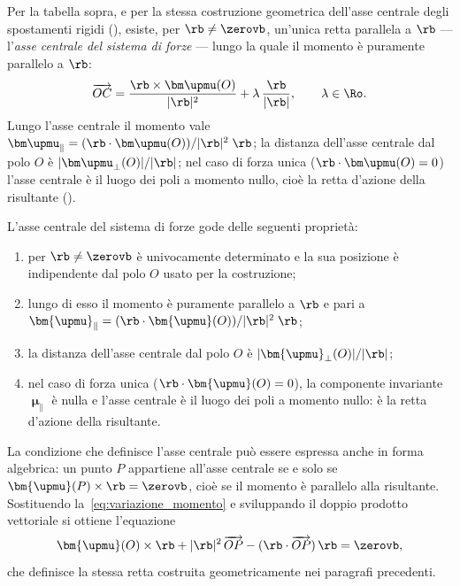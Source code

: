 Per la tabella sopra, e per la stessa costruzione geometrica dell'asse centrale degli spostamenti rigidi (), esiste, per $\rb\neq\zerovb$, un'unica
retta parallela a $\rb$ --- l'\textit{asse centrale del sistema di
	forze} --- lungo la
quale il momento è puramente parallelo a $\rb$:
\begin{equation}\label{eq:asse_centrale_forze}
	\overrightarrow{OC}
	= \frac{\rb\times\bm\upmu(O)}{|\rb|^2}
	+ \lambda\,\frac{\rb}{|\rb|}, \qquad \lambda\in\Ro.
\end{equation}
Lungo l'asse centrale il momento vale $\bm\upmu_\parallel
= (\rb\cdot\bm\upmu(O))/|\rb|^2\;\rb$; la distanza dell'asse centrale dal
polo $O$ è $|\bm\upmu_\perp(O)|/|\rb|$; nel caso di forza unica
($\rb\cdot\bm\upmu(O)=0$) l'asse centrale è il luogo dei poli a momento
nullo, cioè la retta d'azione della risultante
().






L'asse centrale del sistema di forze gode delle seguenti
proprietà:
\begin{enumerate}[label=(\roman*)]
	\item per $\rb \neq \zerovb$ è univocamente determinato e
	la sua posizione è indipendente dal polo $O$ usato per la
	costruzione;
	\item lungo di esso il momento è puramente parallelo a
	$\rb$ e pari a
	$\bm{\upmu}_{\parallel}
	= (\rb \cdot \bm{\upmu}(O))/|\rb|^2\;\rb$;
	\item la distanza dell'asse centrale dal polo $O$ è
	$|\bm{\upmu}_{\perp}(O)|/|\rb|$;
	\item nel caso di forza unica
	($\rb \cdot \bm{\upmu}(O) = 0$), la componente invariante
	$\bm{\upmu}_{\parallel}$ è nulla e l'asse centrale è il
	luogo dei poli a momento nullo: è la retta d'azione della
	risultante.
\end{enumerate}

\begin{oss}
	La condizione che definisce l'asse centrale può essere
	espressa anche in forma algebrica: un punto $P$ appartiene
	all'asse centrale se e solo se
	$\bm{\upmu}(P) \times \rb = \zerovb$, cioè se il momento
	è parallelo alla risultante. Sostituendo
	la~\eqref{eq:variazione_momento} e sviluppando il doppio
	prodotto vettoriale si ottiene l'equazione
	\begin{equation}\label{eq:asse_centrale_algebrica_F}
		\bm{\upmu}(O) \times \rb
		+ |\rb|^2\,\overrightarrow{OP}
		- (\rb \cdot \overrightarrow{OP})\,\rb
		= \zerovb,
	\end{equation}
	che definisce la stessa retta costruita geometricamente
	nei paragrafi precedenti.
\end{oss}

